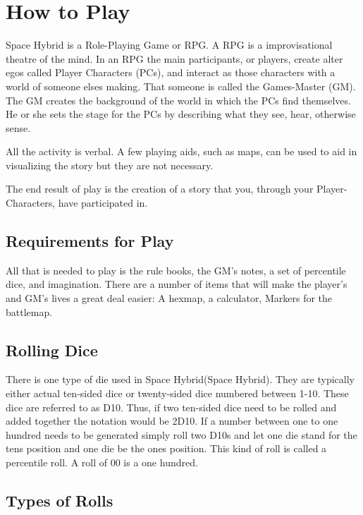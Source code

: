 \chapter{How to Play}

Space Hybrid is a Role-Playing Game or RPG. A RPG is a improvisational theatre 
of the mind. In an RPG the main participants, or players, create alter egos called
Player Characters (PCs), and interact as those characters with a world of someone
elses making. That someone is called the Games-Master (GM). The GM creates the 
background of the world in which the PCs find themselves. He or she sets 
the stage for the PCs by describing what they see, hear, otherwise sense. 

All the activity is verbal. A few playing aids, such as maps, can be used 
to aid in visualizing the story but they are not necessary. 

The end result of play is the creation of a story that you, through
your Player-Characters, have participated in. 

\section{Requirements for Play}

All that is needed to play is the rule books, the GM's notes, 
a set of percentile dice, and imagination. There are a number of items that 
will make the player's and GM's lives a great deal easier: 
A hexmap, a calculator, Markers for the battlemap.

\section{Rolling Dice}

There is one type of die used in Space Hybrid(Space Hybrid). They are
typically either actual ten-sided dice or twenty-sided dice 
numbered between 1-10. These dice are referred to as D10. Thus,
if two ten-sided dice need to be rolled and added together the 
notation would be 2D10. If a number between one to one hundred needs
to be generated simply roll two D10s and let one die stand for the 
tens position and one die be the ones position. This kind of roll is 
called a percentile roll. A roll of 00 is a one hundred. 

\section{Types of Rolls}

